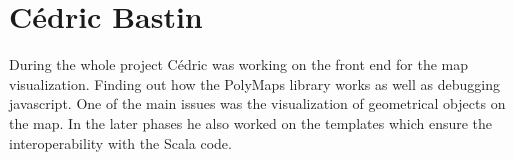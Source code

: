 \section{C\'{e}dric Bastin}

During the whole project C\'{e}dric was working on the front end for the map visualization. Finding out how the PolyMaps library works as well as debugging javascript. One of the main issues was the visualization of geometrical objects on the map. In the later phases he also worked on the templates which ensure the interoperability with the Scala code.
